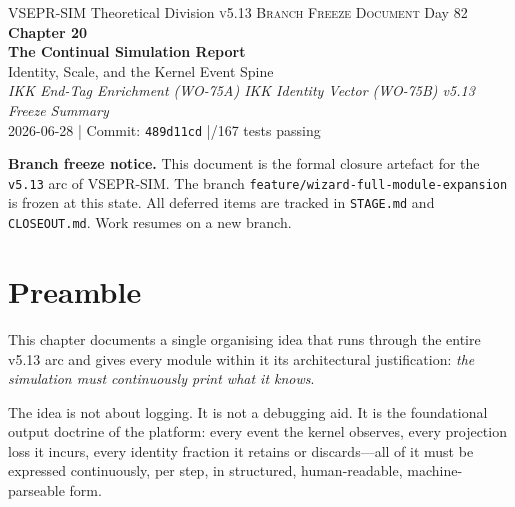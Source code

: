 \documentclass[11pt,a4paper]{article}
\theoremstyle{definition}
\begin{document}
\thispagestyle{empty}

\begin{center}
  {\footnotesize\sffamily VSEPR-SIM Theoretical Division
	\quad\textperiodcentered\quad
	\textsc{v5.13 Branch Freeze Document}
	\quad\textperiodcentered\quad Day 82}\\[10pt]
  {\LARGE\bfseries\color{vsimdark} Chapter 20}\\[6pt]
  {\Large\bfseries The Continual Simulation Report}\\[4pt]
  {\large Identity, Scale, and the Kernel Event Spine}\\[16pt]
  {\normalsize\itshape
	IKK End-Tag Enrichment (WO-75A)
	\quad\textperiodcentered\quad
	IKK Identity Vector (WO-75B)
	\quad\textperiodcentered\quad
	v5.13 Freeze Summary}\\[6pt]
  {\small 2026-06-28 \quad|\quad
	Commit: \texttt{489d11cd} \quad|/167 tests passing}
\end{center}

\vspace{12pt}
\begin{mdframed}[style=freezebox]
\textbf{Branch freeze notice.}\quad
This document is the formal closure artefact for the \texttt{v5.13} arc of
VSEPR-SIM\@.  The branch \texttt{feature/wizard-full-module-expansion} is
frozen at this state.  All deferred items are tracked in \texttt{STAGE.md}
and \texttt{CLOSEOUT.md}.  Work resumes on a new branch.
\end{mdframed}

\vspace{8pt}
\tableofcontents
\clearpage

\section{Preamble}

This chapter documents a single organising idea that runs through the entire
v5.13 arc and gives every module within it its architectural justification:
\emph{the simulation must continuously print what it knows}.

The idea is not about logging.  It is not a debugging aid.  It is the
foundational output doctrine of the platform: every event the kernel observes,
every projection loss it incurs, every identity fraction it retains or
discards---all of it must be expressed continuously, per step, in structured,
human-readable, machine-parseable form.
\end{document}
